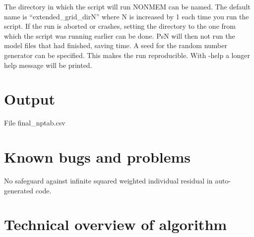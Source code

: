 \begin{optionlist}
The directory in which the script will run NONMEM can be named. The default name is “extended\_grid\_dirN” where N is increased by 1 each time you run the script. If the run is aborted or crashes, setting the directory to the one from which the script was running earlier can be done. PsN will then not run the model files that had finished, saving time. 
\nextopt
{}
A seed for the random number generator can be specified. This makes the run reproducible.   
\nextopt
{}
With -help a longer help message will be printed. 
\nextopt
\end{optionlist}


\section{Output}

File final\_nptab.csv

\section{Known bugs and problems}

No safeguard against infinite squared weighted individual residual in auto-generated code.

\section{Technical overview of algorithm}

